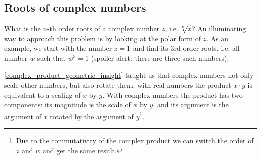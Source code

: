 \subsection{Roots of complex numbers}
What is the $n$-th order roots of a complex number $z$, i.e. $\nroot{n}{z}$? An illuminating way to approach this problem is by looking at the polar form of $z$. As an example, we start with the number $z=1$ and find its 3rd order roots, i.e. all number $w$ such that $w^{3}=1$ (spoiler alert: there are three such numbers).

\eqref{complex_product_geometric_insight} taught us that complex numbers not only scale other numbers, but also rotate them: with real numbers the product $x \cdot y$ is equivalent to a scaling of $x$ by $y$. With complex numbers the product has two components: its magnitude is the scale of $x$ by $y$, and its argument is the argument of $x$ rotated by the argument of $y$\footnote{Due to the commutativity of the complex product we can switch the order of $z$ and $w$ and get the same result.}.

